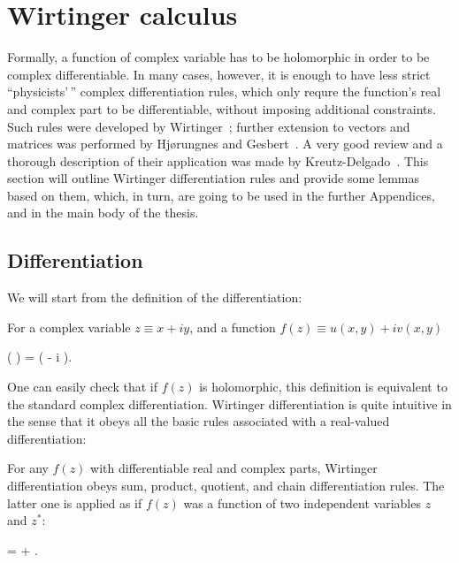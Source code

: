 \chapter{Wirtinger calculus}
\label{cha:appendix:c-numbers}

Formally, a function of complex variable has to be holomorphic in order to be complex differentiable.
In many cases, however, it is enough to have less strict ``physicists'\,'' complex differentiation rules, which only requre the function's real and complex part to be differentiable, without imposing additional constraints.
Such rules were developed by Wirtinger~\cite{Wirtinger1927}; further extension to vectors and matrices was performed by Hj{\o}rungnes and Gesbert~\cite{Hjorungnes2007}.
A very good review and a thorough description of their application was made by Kreutz-Delgado~\cite{Kreutz-Delgado2009}.
This section will outline Wirtinger differentiation rules and provide some lemmas based on them, which, in turn, are going to be used in the further Appendices, and in the main body of the thesis.


\section{Differentiation}

We will start from the definition of the differentiation:

\begin{definition}
\label{def:c-numbers:wirtinger}
	For a complex variable $z \equiv x + iy$, and a function $f(z) \equiv u(x, y) + iv(x, y)$
	\begin{eqn*}
		\left(  \right)
		=  \left(
			 - i 
		\right).
	\end{eqn*}
\end{definition}

One can easily check that if $f(z)$ is holomorphic, this definition is equivalent to the standard complex differentiation.
Wirtinger differentiation is quite intuitive in the sense that it obeys all the basic rules associated with a real-valued differentiation:

\begin{theorem}
\label{thm:c-numbers:diff-properties}
	For any $f(z)$ with differentiable real and complex parts, Wirtinger differentiation obeys sum, product, quotient, and chain differentiation rules.
	The latter one is applied as if $f(z)$ was a function of two independent variables $z$ and $z^*$:
	\begin{eqn*}
		\frac{\upd f(g(z))}{\upd z}
		=  \frac{\upd g}{\upd z}
			+  \frac{\upd g^*}{\upd z}.
	\end{eqn*}
\end{theorem}

